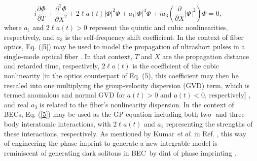 \documentclass[preprintnumbers]{revtex4}
\begin{document}
\begin{equation}
i\frac{\partial \Phi }{\partial T}+\frac{\partial ^{2}\Phi }{\partial X^{2}}%
+2\ell a(t)\left\vert \Phi \right\vert ^{2}\Phi +\allowbreak a_{1}\left\vert
\Phi \right\vert ^{4}\Phi +ia_{3}\left( \frac{\partial }{\partial X}%
\left\vert \Phi \right\vert ^{2}\right) \Phi =0,  \label{5}
\end{equation}%
where $a_{1}$ and $2\ell a(t)>0$ represent the quintic and cubic
nonlinearities, respectively, and $a_{3}$ is the self-frequency shift
coefficient. In the context of fiber optics, Eq. (\ref{5}) may be used to
model the propagation of ultrashort pulses in a single-mode optical fiber
\cite{28}. In that context, $T$ and $X$ are the propagation distance and
retarded time, respectively, $2\ell a(t)$ is the coefficient of the cubic
nonlinearity [in the optics counterpart of Eq. (5), this coefficient may
then be rescaled into one multiplying the group-velocity dispersion (GVD)
term, which is termed anomalous and normal GVD for $a(t)>0$ and $a(t)<0$,
respectively] \cite{29,25}, and real $a_{3}$ is related to the fiber's
nonlinearity dispersion. In the context of BECs, Eq. (\ref{5}) may be used
as the GP equation including both two- and three-body interatomic
interactions, with $2\ell a(t)$ and $a_{1}$ representing the strengths of
these interactions, respectively. As mentioned by Kumar \textit{et al}. in
Ref. \cite{17}, this way of engineering the phase imprint to generate a new
integrable model is reminiscent of generating dark solitons in BEC\ by dint
of phase imprinting \cite{29a}.
\end{document}
